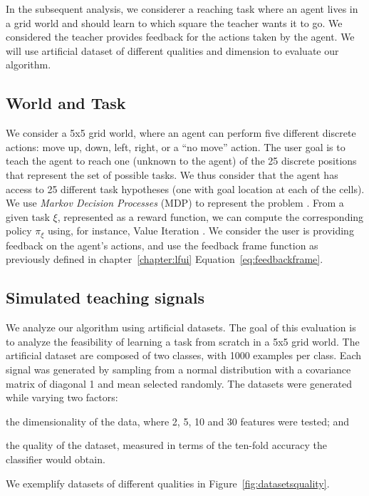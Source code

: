 In the subsequent analysis, we considerer a reaching task where an agent lives in a grid world and should learn to which square the teacher wants it to go. We considered the teacher provides feedback for the actions taken by the agent. We will use artificial dataset of different qualities and dimension to evaluate our algorithm.


\subsection{World and Task}

We consider a 5x5 grid world, where an agent can perform five different discrete actions: move up, down, left, right, or a ``no move'' action. The user goal is to teach the agent to reach one (unknown to the agent) of the 25 discrete positions that represent the set of possible tasks. We thus consider that the agent has access to 25 different task hypotheses (one with goal location at each of the cells). We use \textit{Markov Decision Processes} (MDP) to represent the problem \cite{sutton1998reinforcement}. From a given task $\xi$, represented as a reward function, we can compute the corresponding policy $\pi_{\xi}$ using, for instance, Value Iteration \cite{sutton1998reinforcement}. We consider the user is providing feedback on the agent's actions, and use the feedback frame function as previously defined in chapter~\ref{chapter:lfui} Equation~\ref{eq:feedbackframe}.


\subsection{Simulated teaching signals}
\label{chapter:planning:artificialsignals}

We analyze our algorithm using artificial datasets. The goal of this evaluation is to analyze the feasibility of learning a task from scratch in a 5x5 grid world. The artificial dataset are composed of two classes, with 1000 examples per class. Each signal was generated by sampling from a normal distribution with a covariance matrix of diagonal 1 and mean selected randomly. The datasets were generated while varying two factors: \begin{inparaenum}[(i)] \item the dimensionality of the data, where 2, 5, 10 and 30 features were tested; and \item the quality of the dataset, measured in terms of the ten-fold accuracy the classifier would obtain. \end{inparaenum} We exemplify datasets of different qualities in Figure~\ref{fig:datasetsquality}.

